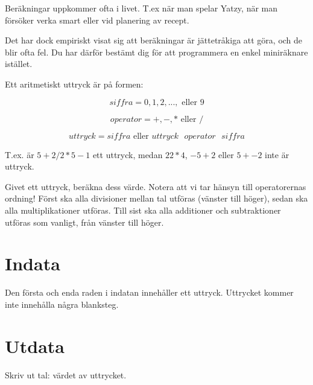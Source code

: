 
Beräkningar uppkommer ofta i livet. T.ex när man spelar Yatzy, när man försöker verka smart eller vid planering av recept.

Det har dock empiriskt visat sig att beräkningar är jättetråkiga att göra, och de blir ofta fel. Du har därför
bestämt dig för att programmera en enkel miniräknare istället.

Ett aritmetiskt uttryck är på formen:

$$siffra = 0, 1, 2, ..., \text{ eller } 9$$

$$operator = +, -, * \text{ eller } /$$

$$uttryck = siffra \text{ eller } uttryck \text{ } operator \text{ } siffra$$

T.ex. är $5 + 2 / 2 * 5 - 1$ ett uttryck, medan $22 * 4$, $-5 + 2$ eller $5 + - 2$ inte är uttryck.

Givet ett uttryck, beräkna dess värde. Notera att vi tar hänsyn till operatorernas ordning! Först ska alla divisioner mellan tal utföras (vänster till höger), sedan ska alla multiplikationer utföras. Till sist ska alla additioner och subtraktioner utföras som vanligt, från vänster till höger.

\section*{Indata}
Den första och enda raden i indatan innehåller ett uttryck. Uttrycket kommer inte innehålla några blanksteg.

\section*{Utdata}
Skriv ut tal: värdet av uttrycket.
